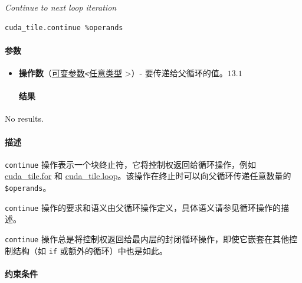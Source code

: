 \documentclass{article}
\begin{document}
\textit{Continue to next loop iteration}


\begin{lstlisting}
cuda_tile.continue %operands
\end{lstlisting}

\paragraph{参数}

\begin{itemize}
\item \textbf{操作数}（\href{https://docs.nvidia.com/cuda/tile-ir/latest/sections/operations.html#type-variadic}{可变参数}\texttt{<}\href{https://docs.nvidia.com/cuda/tile-ir/latest/sections/operations.html#type-any}{任意类型} >）- 要传递给父循环的值。$\boxed{13.1}$


\paragraph{结果}

\end{itemize}
No results.



\paragraph{描述}

\texttt{continue} 操作表示一个块终止符，它将控制权返回给循环操作，例如 \href{https://docs.nvidia.com/cuda/tile-ir/latest/sections/operations.html#op-cuda-tile-for}{cuda\_tile.for} 和 \href{https://docs.nvidia.com/cuda/tile-ir/latest/sections/operations.html#op-cuda-tile-loop}{cuda\_tile.loop}。该操作在终止时可以向父循环传递任意数量的 \texttt{\$operands}。


\texttt{continue} 操作的要求和语义由父循环操作定义，具体语义请参见循环操作的描述。


\texttt{continue} 操作总是将控制权返回给最内层的封闭循环操作，即使它嵌套在其他控制结构（如 \texttt{if} 或额外的循环）中也是如此。



\paragraph{约束条件}
\end{document}
